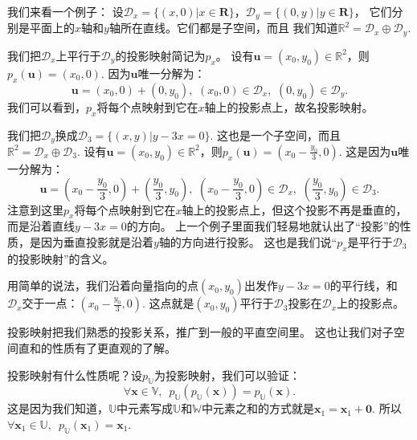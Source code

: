\documentclass[12pt,UTF8,fontset=none]{ctexbook}
\begin{document}
我们来看一个例子：
设$\mathcal{D}_x = \{(x,0)|x\in\mathbf{R}\}$，$\mathcal{D}_y = \{(0,y)|y\in\mathbf{R}\}$，
它们分别是平面上的$x$轴和$y$轴所在直线。它们都是子空间，而且
我们知道$\mathbb{R}^2 = \mathcal{D}_x \oplus \mathcal{D}_y.$

我们把$\mathcal{D}_x$上平行于$\mathcal{D}_y$的投影映射简记为$p_x$。
设有$\mathbf{u} = (x_0, y_0) \in\mathbb{R}^2$，则$p_x(\mathbf{u}) = (x_0,0)$.
因为$\mathbf{u}$唯一分解为：
$$\mathbf{u} = (x_0,0) + (0,y_0), \,\,(x_0,0)\in\mathcal{D}_x,\,\,(0,y_0)\in\mathcal{D}_y.$$
我们可以看到，$p_x$将每个点映射到它在$x$轴上的投影点上，故名投影映射。

我们把$\mathcal{D}_y$换成$\mathcal{D}_{3} = \{(x, y) | y - 3x = 0\}.$
这也是一个子空间，而且$\mathbb{R}^2 = \mathcal{D}_x \oplus \mathcal{D}_3.$
设有$\mathbf{u} = (x_0, y_0) \in\mathbb{R}^2$，则$p_x(\mathbf{u}) = (x_0-\frac{y_0}{3},0)$.
这是因为$\mathbf{u}$唯一分解为：
$$\mathbf{u} = (x_0-\frac{y_0}{3},0) + (\frac{y_0}{3},y_0), \,\,(x_0-\frac{y_0}{3},0)\in\mathcal{D}_x,\,\,(\frac{y_0}{3},y_0)\in\mathcal{D}_3.$$
注意到这里$p_x$将每个点映射到它在$x$轴上的投影点上，但这个投影不再是垂直的，而是沿着直线$y - 3x = 0$的方向。
上一个例子里面我们轻易地就认出了“投影”的性质，是因为垂直投影就是沿着$y$轴的方向进行投影。
这也是我们说“$p_x$是平行于$\mathcal{D}_{3}$的投影映射”的含义。

用简单的说法，我们沿着向量指向的点$(x_0, y_0)$出发作$y - 3x = 0$的平行线，和$\mathcal{D}_x$交于一点：$(x_0-\frac{y_0}{3},0).$
这点就是$(x_0, y_0)$平行于$\mathcal{D}_3$投影在$\mathcal{D}_x$上的投影点。

投影映射把我们熟悉的投影关系，推广到一般的平直空间里。
这也让我们对子空间直和的性质有了更直观的了解。

投影映射有什么性质呢？设$p_{\mathbb{U}}$为投影映射，我们可以验证：
$$ \forall \mathbf{x} \in \mathbb{V},\,\,\,p_{\mathbb{U}}(p_{\mathbb{U}}(\mathbf{x})) = p_{\mathbb{U}}(\mathbf{x}).$$
这是因为我们知道，$\mathbb{U}$中元素写成$\mathbb{U}$和$\mathbb{W}$中元素之和的方式就是$\mathbf{x}_1 = \mathbf{x}_1 + \mathbf{0}.$
所以$\forall \mathbf{x}_1\in\mathbb{U},\,\,\, p_{\mathbb{U}}(\mathbf{x}_1) = \mathbf{x}_1.$
\end{document}
